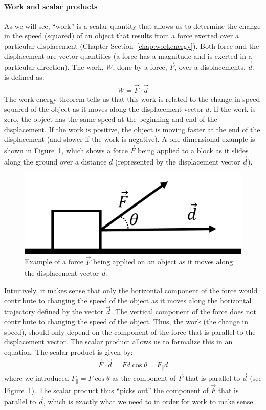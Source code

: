 \paragraph{Work and scalar products}

As we will see, ``work'' is a scalar quantity that allows us to determine the change in the speed (squared) of an object that results from a force exerted over a particular displacement (Chapter Section~\ref{chap:workenergy}). Both force and the displacement are vector quantities (a force has a magnitude and is exerted in a particular direction). The work, $W$, done by a force, $\vec F$, over a displacements, $\vec d$, is defined as:
\begin{align*}
W = \vec F \cdot \vec d
\end{align*}
The work energy theorem tells us that this work is related to the change in speed squared of the object as it moves along the displacement vector $d$. If the work is zero, the object has the same speed at the beginning and end of the displacement. If the work is positive, the object is moving faster at the end of the displacement (and slower if the work is negative). A one dimensional example is shown in Figure~\ref{fig:Vectors:work_scalarprod}, which shows a force $\vec F$ being applied to a block as it slides along the ground over a distance $d$ (represented by the displacement vector $\vec d$).

\begin{figure}[!htbp]
\centering
\includegraphics[width=0.625\linewidth]{files/work_scalarprod-31c94373518d315f6fb766143522e2b4.png}
\caption[]{Example of a force $\vec F$ being applied on an object as it moves along the displacement vector $\vec d$.}
\label{fig:Vectors:work_scalarprod}
\end{figure}

Intuitively, it makes sense that only the horizontal component of the force would contribute to changing the speed of the object as it moves along the horizontal trajectory defined by the vector $\vec d$. The vertical component of the force does not contribute to changing the speed of the object. Thus, the work (the change in speed), should only depend on the component of the force that is parallel to the displacement vector. The scalar product allows us to formalize this in an equation. The scalar product is given by:
\begin{align*}
\vec F \cdot \vec d = Fd\cos\theta = F_{\parallel}d
\end{align*}
where we introduced $F_{\parallel} = F\cos\theta$ as the component of $\vec F$ that is parallel to $\vec d$ (see Figure~\ref{fig:Vectors:work_scalarprod}). The scalar product thus ``picks out'' the component of $\vec F$ that is parallel to $\vec d$, which is exactly what we need to in order for work to make sense.

